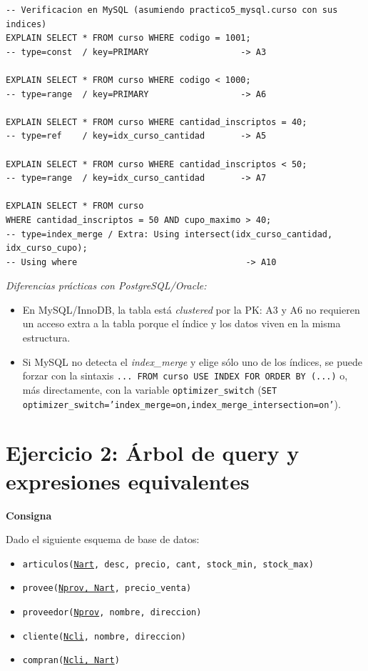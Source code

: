 \documentclass[11pt,a4paper]{article}
\newcommand{\itemcabecera}[1]{\noindent\textbf{#1}\par\medskip}
\newcommand{\bloqueConsigna}{\itemcabecera{Consigna}}
\begin{document}
\begin{lstlisting}
-- Verificacion en MySQL (asumiendo practico5_mysql.curso con sus indices)
EXPLAIN SELECT * FROM curso WHERE codigo = 1001;
-- type=const  / key=PRIMARY                  -> A3

EXPLAIN SELECT * FROM curso WHERE codigo < 1000;
-- type=range  / key=PRIMARY                  -> A6

EXPLAIN SELECT * FROM curso WHERE cantidad_inscriptos = 40;
-- type=ref    / key=idx_curso_cantidad       -> A5

EXPLAIN SELECT * FROM curso WHERE cantidad_inscriptos < 50;
-- type=range  / key=idx_curso_cantidad       -> A7

EXPLAIN SELECT * FROM curso
WHERE cantidad_inscriptos = 50 AND cupo_maximo > 40;
-- type=index_merge / Extra: Using intersect(idx_curso_cantidad, idx_curso_cupo);
-- Using where                                 -> A10
\end{lstlisting}

\textit{Diferencias prácticas con PostgreSQL/Oracle:}

\begin{itemize}
    \item En MySQL/InnoDB, la tabla está \emph{clustered} por la PK: A3 y A6 no requieren un acceso extra a la tabla porque el índice y los datos viven en la misma estructura.
    \item Si MySQL no detecta el \emph{index\_merge} y elige sólo uno de los índices, se puede forzar con la sintaxis \texttt{... FROM curso USE INDEX FOR ORDER BY (...)} o, más directamente, con la variable \texttt{optimizer\_switch} (\texttt{SET optimizer\_switch='index\_merge=on,index\_merge\_intersection=on'}).
\end{itemize}

\section{Ejercicio 2: Árbol de query y expresiones equivalentes}

\bloqueConsigna

Dado el siguiente esquema de base de datos:

\begin{itemize}
    \item \texttt{articulos(\underline{Nart}, desc, precio, cant, stock\_min, stock\_max)}
    \item \texttt{provee(\underline{Nprov, Nart}, precio\_venta)}
    \item \texttt{proveedor(\underline{Nprov}, nombre, direccion)}
    \item \texttt{cliente(\underline{Ncli}, nombre, direccion)}
    \item \texttt{compran(\underline{Ncli, Nart})}
\end{itemize}
\end{document}
